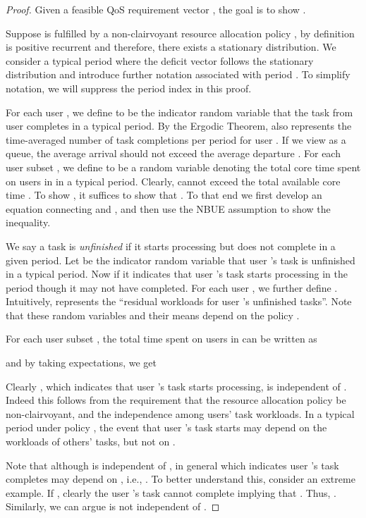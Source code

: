 \documentclass[prodmode,acmtompecs]{acmsmall}
\begin{document}
\begin{proof}
Given a feasible QoS requirement vector , the goal is to show . 

Suppose  is fulfilled by a non-clairvoyant resource allocation policy , by definition  is positive recurrent and therefore, there exists a stationary distribution. 
We consider a typical period where the deficit vector  follows the stationary distribution and introduce further notation associated with period . To simplify notation, we will suppress the period index in this proof. 

For each user , we define  to be the indicator random variable that the task from user  completes in a typical period. By the Ergodic Theorem,  also represents the time-averaged number of task completions per period for user . If we view  as a queue, the average arrival  should not exceed the average departure . For each user subset , we define  to be a random variable denoting the total core time spent on users in  in a typical period. Clearly,  cannot exceed the total available core time . To show , it suffices to show that . To that end we first develop an equation connecting  and , and then use the NBUE assumption to show the inequality. 

We say a task is {\em unfinished} if it starts processing but does not complete in a given period. Let  be the indicator random variable that user 's task is unfinished in a typical period. Now if  it indicates that user 's task starts processing in the period though it may not have completed. 
For each user , we further define . Intuitively,  represents the ``residual workloads for user 's unfinished tasks''. 
Note that these random variables and their means depend on the policy . 

For each user subset , the total time spent on users in  can be written as

and by taking expectations, we get


Clearly , which indicates that user 's task starts processing, is independent of . Indeed this follows from the requirement that the resource allocation policy be non-clairvoyant, and the independence among users' task workloads. In a typical period under policy , the event that user 's task starts may depend on the workloads of others' tasks, but not on . 

Note that although  is independent of , in general  which indicates user 's task completes may depend on , i.e., . To better understand this, consider an extreme example. If , clearly the user 's task cannot complete implying that . Thus, . 
Similarly, we can argue  is not independent of . 


\end{proof}
\end{document}
